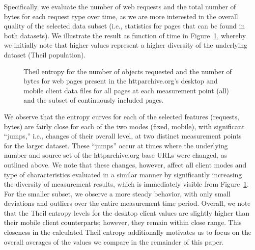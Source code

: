 \documentclass[journal,final]{IEEEtran}
\begin{document}
Specifically, we evaluate the number of web requests and the total number of bytes for each request type over time, as we are more interested in the overall quality of the selected data subset (i.e., statistics for pages that can be found in both datasets).
We illustrate the result as function of time in Figure~\ref{fig:theil}, whereby we initially note that higher values represent a higher diversity of the underlying dataset (Theil population).
\begin{figure}[t]
	\centering
	\qquad
	\caption{Theil entropy for the number of objects requested and the number of bytes for web pages present in the httparchive.org's desktop and mobile client data files for all pages at each measurement point (all) and the subset of continuously included pages.}
	\label{fig:theil}
\end{figure}
We observe that the entropy curves for each of the selected features (requests, bytes) are fairly close for each of the two modes (fixed, mobile), with significant ``jumps,'' i.e., changes of their overall level, at two distinct measurement points for the larger dataset.
These ``jumps'' occur at times where the underlying number and source set of the httparchive.org base URLs were changed, as outlined above.
We note that these changes, however, affect all client modes and type of characteristics evaluated in a similar manner by significantly increasing the diversity of measurement results, which is immediately visible from Figure~\ref{fig:theil}.
For the smaller subset, we observe a more steady behavior, with only small deviations and outliers over the entire measurement time period.
Overall, we note that the Theil entropy levels for the desktop client values are slightly higher than their mobile client counterparts; however, they remain within close range.
This closeness in the calculated Theil entropy additionally motivates us to focus on the overall averages of the values we compare in the remainder of this paper.
\end{document}
